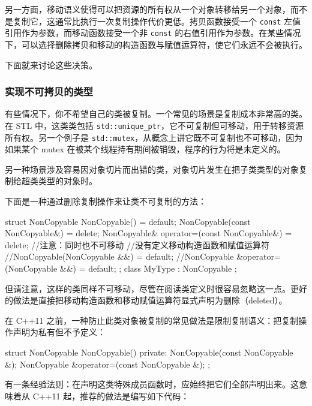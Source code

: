 \label{idx:520}
\label{idx:521}
另一方面，移动语义使得可以把资源的所有权从一个对象转移给另一个对象，而不是复制它，这通常比执行一次复制操作代价更低。拷贝函数接受一个 \texttt{const} 左值引用作为参数，而移动函数接受一个非 \texttt{const} 的右值引用作为参数。在某些情况下，可以选择删除拷贝和移动的构造函数与赋值运算符，使它们永远不会被执行。

下面就来讨论这些决策。

\subsubsection{实现不可拷贝的类型}

\label{idx:522}
有些情况下，你不希望自己的类被复制。一个常见的场景是复制成本非常高的类。在 STL 中，这类类包括 \texttt{std::\allowbreak{}unique\_\allowbreak{}ptr}，它不可复制但可移动，用于转移资源所有权。另一个例子是 \texttt{std::\allowbreak{}mutex}，从概念上讲它既不可复制也不可移动，因为如果某个 mutex 在被某个线程持有期间被销毁，程序的行为将是未定义的。

另一种场景涉及容易因对象切片而出错的类，对象切片发生在把子类类型的对象复制给超类类型的对象时。

下面是一种通过删除复制操作来让类不可复制的方法：

\begin{codebox}[cpp]
struct NonCopyable {
    NonCopyable() = default;
    NonCopyable(const NonCopyable&) = delete;
    NonCopyable& operator=(const NonCopyable&) = delete;
    //注意：同时也不可移动
    //没有定义移动构造函数和赋值运算符
    //NonCopyable(NonCopyable &&) = default;
    //NonCopyable &operator=(NonCopyable &&) = default;
};
class MyType : NonCopyable {};
\end{codebox}

但请注意，这样的类同样不可移动，尽管在阅读类定义时很容易忽略这一点。更好的做法是直接把移动构造函数和移动赋值运算符显式声明为删除（deleted）。

\label{idx:523}
在 C++11 之前，一种防止此类对象被复制的常见做法是限制复制语义：把复制操作声明为私有但不予定义：

\begin{codebox}[cpp]
struct NonCopyable {
    NonCopyable() {}
private:
    NonCopyable(const NonCopyable &);
    NonCopyable &operator=(const NonCopyable &);
};
\end{codebox}

有一条经验法则：在声明这类特殊成员函数时，应始终把它们全部声明出来。这意味着从 C++11 起，推荐的做法是编写如下代码：

